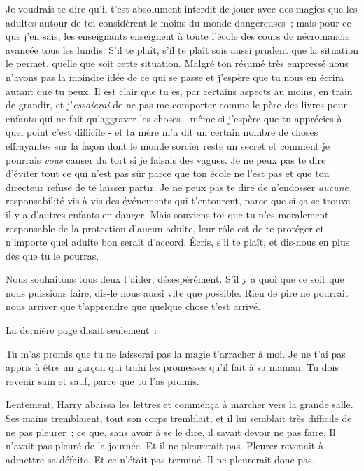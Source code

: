 \begin{writtenNote}
Je voudrais te dire qu'il t'est absolument interdit de jouer avec des magies que les adultes autour de toi considèrent le moins du monde dangereuses~; mais pour ce que j'en sais, les enseignants enseignent à toute l'école des cours de nécromancie avancée tous les lundis. S'il te plaît, s'il te plaît sois aussi prudent que la situation le permet, quelle que soit cette situation. Malgré ton résumé très empressé nous n'avons pas la moindre idée de ce qui se passe et j'espère que tu nous en écrira autant que tu peux. Il est clair que tu es, par certains aspects au moins, en train de grandir, et j'\emph{essaierai} de ne pas me comporter comme le père des livres pour enfants qui ne fait qu'aggraver les choses - même si j'espère que tu apprécies à quel point c'est difficile - et ta mère m'a dit un certain nombre de choses effrayantes sur la façon dont le monde sorcier reste un secret et comment je pourrais \emph{vous} causer du tort si je faisais des vagues. Je ne peux pas te dire d'éviter tout ce qui n'est pas sûr parce que ton école ne l'est pas et que ton directeur refuse de te laisser partir. Je ne peux pas te dire de n'endosser \emph{aucune} responsabilité vis à vis des événements qui t'entourent, parce que si ça se trouve il y a d'autres enfants en danger. Mais souviens toi que tu n'es moralement responsable de la protection d'aucun adulte, leur rôle est de te protéger et n'importe quel adulte bon serait d'accord. Écris, s'il te plaît, et dis-nous en plus dès que tu le pourras.

Nous souhaitons tous deux t'aider, désespérément. S'il y a quoi que ce soit que nous puissions faire, dis-le nous aussi vite que possible. Rien de pire ne pourrait nous arriver que t'apprendre que quelque chose t'est arrivé.

\end{writtenNote}

La dernière page disait seulement~:

\begin{writtenNote}
Tu m'as promis que tu ne laisserai pas la magie t'arracher à moi. Je ne t'ai pas appris à être un garçon qui trahi les promesses qu'il fait à sa maman. Tu dois revenir sain et sauf, parce que tu l'as promis.

\end{writtenNote}

Lentement, Harry abaissa les lettres et commença à marcher vers la grande salle. Ses mains tremblaient, tout son corps tremblait, et il lui semblait très difficile de ne pas pleurer~; ce que, sans avoir à se le dire, il savait devoir ne pas faire. Il n'avait pas pleuré de la journée. Et il ne pleurerait pas. Pleurer revenait à admettre sa défaite. Et ce n'était pas terminé. Il ne pleurerait donc pas.

